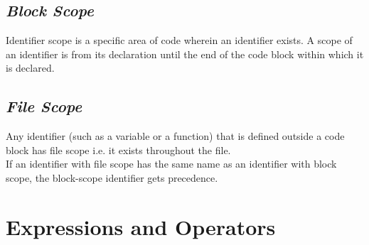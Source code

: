    \subsection{\textit{Block Scope}}
    Identifier scope is a specific area of code wherein an identifier exists. A scope of an identifier is from its declaration until the end of the code block within which it is declared.
    
    \subsection{\textit{File Scope}}
    Any identifier (such as a variable or a function) that is defined outside a code block has file scope i.e. it exists throughout the file.\\
    If an identifier with file scope has the same name as an identifier with block scope, the block-scope identifier gets precedence.

\section{Expressions and Operators}
